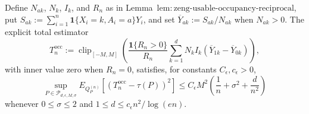 Define \(N_{ak}\), \(N_k\), \(I_k\), and \(R_n\) as in Lemma~\(\mathrm{lem:zeng\text{-}usable\text{-}occupancy\text{-}reciprocal}\), put \(S_{ak}:=\sum_{i=1}^n\mathbf 1\{X_i=k,A_i=a\}Y_i\), and set \(\overline Y_{ak}:=S_{ak}/N_{ak}\) when \(N_{ak}>0\).  The explicit total estimator
\[
 T_n^{\mathrm{occ}}:=\operatorname{clip}_{[-M,M]}\!\left(
 \frac{\mathbf 1\{R_n>0\}}{R_n}
 \sum_{k=1}^dN_kI_k(\overline Y_{1k}-\overline Y_{0k})
 \right),
\]
with inner value zero when \(R_n=0\), satisfies, for constants \(C_{\epsilon},c_{\epsilon}>0\),
\[
 \sup_{P\in\mathcal P_{d,\epsilon,M,\sigma}}
 E_{Q_P^{(n)}}[(T_n^{\mathrm{occ}}-\tau(P))^2]
 \le C_{\epsilon}M^2\left(\frac1n+\sigma^2+\frac d{n^2}\right)
\]
whenever \(0\le\sigma\le2\) and \(1\le d\le c_{\epsilon}n^2/\log(en)\).